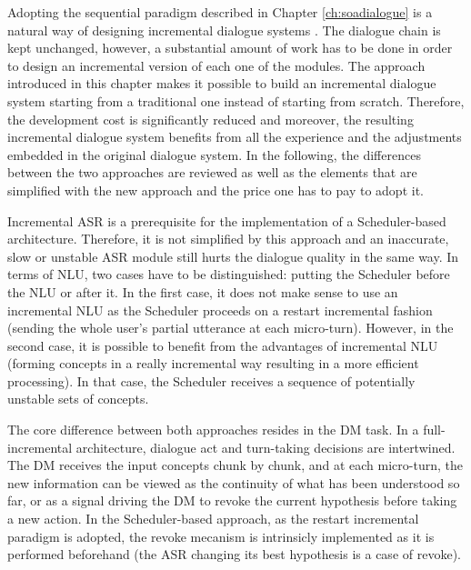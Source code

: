              Adopting the sequential paradigm described in Chapter \ref{ch:soadialogue} is a natural way of designing incremental dialogue systems \cite{Schlangen2011}. The dialogue chain is kept unchanged, however, a substantial amount of work has to be done in order to design an incremental version of each one of the modules. The approach introduced in this chapter makes it possible to build an incremental dialogue system starting from a traditional one instead of starting from scratch. Therefore, the development cost is significantly reduced and moreover, the resulting incremental dialogue system benefits from all the experience and the adjustments embedded in the original dialogue system. In the following, the differences between the two approaches are reviewed as well as the elements that are simplified with the new approach and the price one has to pay to adopt it.

             Incremental ASR is a prerequisite for the implementation of a Scheduler-based architecture. Therefore, it is not simplified by this approach and an inaccurate, slow or unstable ASR module still hurts the dialogue quality in the same way. In terms of NLU, two cases have to be distinguished: putting the Scheduler before the NLU or after it. In the first case, it does not make sense to use an incremental NLU as the Scheduler proceeds on a restart incremental fashion (sending the whole user's partial utterance at each micro-turn). However, in the second case, it is possible to benefit from the advantages of incremental NLU (forming concepts in a really incremental way resulting in a more efficient processing). In that case, the Scheduler receives a sequence of potentially unstable sets of concepts.

             The core difference between both approaches resides in the DM task. In a full-incremental architecture, dialogue act and turn-taking decisions are intertwined. The DM receives the input concepts chunk by chunk, and at each micro-turn, the new information can be viewed as the continuity of what has been understood so far, or as a signal driving the DM to revoke the current hypothesis before taking a new action. In the Scheduler-based approach, as the restart incremental paradigm is adopted, the revoke mecanism is intrinsicly implemented as it is performed beforehand (the ASR changing its best hypothesis is a case of revoke).

